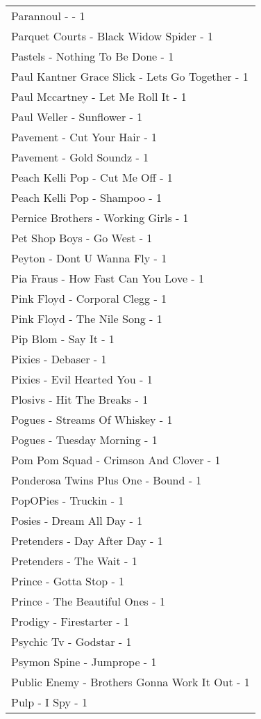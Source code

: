 \documentclass[
]{article}
\begin{document}
\begin{longtable}{l}
Parannoul -  - 1 \\ 
Parquet Courts - Black Widow Spider - 1 \\ 
Pastels - Nothing To Be Done - 1 \\ 
Paul Kantner Grace Slick - Lets Go Together - 1 \\ 
Paul Mccartney - Let Me Roll It - 1 \\ 
Paul Weller - Sunflower - 1 \\ 
Pavement - Cut Your Hair - 1 \\ 
Pavement - Gold Soundz - 1 \\ 
Peach Kelli Pop - Cut Me Off - 1 \\ 
Peach Kelli Pop - Shampoo - 1 \\ 
Pernice Brothers - Working Girls - 1 \\ 
Pet Shop Boys - Go West - 1 \\ 
Peyton - Dont U Wanna Fly - 1 \\ 
Pia Fraus - How Fast Can You Love - 1 \\ 
Pink Floyd - Corporal Clegg - 1 \\ 
Pink Floyd - The Nile Song - 1 \\ 
Pip Blom - Say It - 1 \\ 
Pixies - Debaser - 1 \\ 
Pixies - Evil Hearted You - 1 \\ 
Plosivs - Hit The Breaks - 1 \\ 
Pogues - Streams Of Whiskey - 1 \\ 
Pogues - Tuesday Morning - 1 \\ 
Pom Pom Squad - Crimson And Clover - 1 \\ 
Ponderosa Twins Plus One - Bound - 1 \\ 
PopOPies - Truckin - 1 \\ 
Posies - Dream All Day - 1 \\ 
Pretenders - Day After Day - 1 \\ 
Pretenders - The Wait - 1 \\ 
Prince - Gotta Stop - 1 \\ 
Prince - The Beautiful Ones - 1 \\ 
Prodigy - Firestarter - 1 \\ 
Psychic Tv - Godstar - 1 \\ 
Psymon Spine - Jumprope - 1 \\ 
Public Enemy - Brothers Gonna Work It Out - 1 \\ 
Pulp - I Spy - 1 \\ 

\end{longtable}
\end{document}
